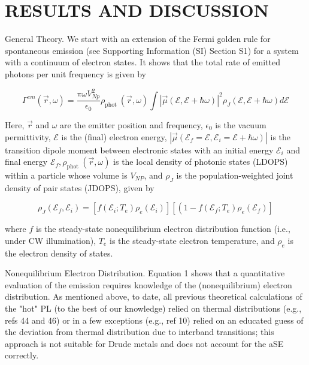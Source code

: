 \documentclass[10pt]{article}
\begin{document}
\section*{RESULTS AND DISCUSSION}
General Theory. We start with an extension of the Fermi golden rule for spontaneous emission (see Supporting Information (SI) Section S1) for a system with a continuum of electron states. It shows that the total rate of emitted photons per unit frequency is given by


\begin{equation*}
\Gamma^{e m}(\vec{r}, \omega)=\frac{\pi \omega V_{N p}^{2}}{\epsilon_{0}} \rho_{\text {phot }}(\vec{r}, \omega) \int|\vec{\mu}(\mathcal{E}, \mathcal{E}+\hbar \omega)|^{2} \rho_{J}(\mathcal{E}, \mathcal{E}+\hbar \omega) d \mathcal{E} \tag{1}
\end{equation*}


Here, $\vec{r}$ and $\omega$ are the emitter position and frequency, $\epsilon_{0}$ is the vacuum permittivity, $\mathcal{E}$ is the (final) electron energy, $\left|\vec{\mu}\left(\mathcal{E}_{f}=\mathcal{E}, \mathcal{E}_{i}=\mathcal{E}+\hbar \omega\right)\right|$ is the transition dipole moment between electronic states with an initial energy $\mathcal{E}_{i}$ and final energy $\mathcal{E}_{f}, \rho_{\text {phot }}(\vec{r}, \omega)$ is the local density of photonic states (LDOPS) within a particle whose volume is $V_{N P}$, and $\rho_{J}$ is the population-weighted joint density of pair states (JDOPS), given by


\begin{equation*}
\rho_{J}\left(\mathcal{E}_{f}, \mathcal{E}_{i}\right)=\left[f\left(\mathcal{E}_{i} ; T_{e}\right) \rho_{e}\left(\mathcal{E}_{i}\right)\right]\left[\left(1-f\left(\mathcal{E}_{f} ; T_{e}\right) \rho_{e}\left(\mathcal{E}_{f}\right)\right]\right. \tag{2}
\end{equation*}


where $f$ is the steady-state nonequilibrium electron distribution function (i.e., under CW illumination), $T_{e}$ is the steady-state electron temperature, and $\rho_{e}$ is the electron density of states.

Nonequilibrium Electron Distribution. Equation 1 shows that a quantitative evaluation of the emission requires knowledge of the (nonequilibrium) electron distribution. As mentioned above, to date, all previous theoretical calculations of the "hot" PL (to the best of our knowledge) relied on thermal distributions (e.g., refs 44 and 46) or in a few exceptions (e.g., ref 10) relied on an educated guess of the deviation from thermal distribution due to interband transitions; this approach is not suitable for Drude metals and does not account for the aSE correctly.
\end{document}
